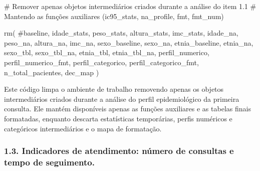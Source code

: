 \documentclass[
]{article}
\newenvironment{Shaded}{\begin{snugshade}}{\end{snugshade}}
\newcommand{\CommentTok}[1]{\textcolor[rgb]{0.37,0.37,0.37}{#1}}
\newcommand{\FunctionTok}[1]{\textcolor[rgb]{0.28,0.35,0.67}{#1}}
\newcommand{\NormalTok}[1]{\textcolor[rgb]{0.00,0.23,0.31}{#1}}
\begin{document}
\begin{Shaded}
\begin{Highlighting}[]
\CommentTok{\# Remover apenas objetos intermediários criados durante a análise do item 1.1}
\CommentTok{\# Mantendo as funções auxiliares (ic95\_stats, na\_profile, fmt, fmt\_num)}

\FunctionTok{rm}\NormalTok{(}
  \CommentTok{\#baseline,}
\NormalTok{  idade\_stats, peso\_stats, altura\_stats, imc\_stats,}
\NormalTok{  idade\_na, peso\_na, altura\_na, imc\_na,}
\NormalTok{  sexo\_baseline, sexo\_na,}
\NormalTok{  etnia\_baseline, etnia\_na,}
\NormalTok{  sexo\_tbl, sexo\_tbl\_na,}
\NormalTok{  etnia\_tbl, etnia\_tbl\_na,}
\NormalTok{  perfil\_numerico, }
\NormalTok{  perfil\_numerico\_fmt,}
\NormalTok{  perfil\_categorico, }
\NormalTok{  perfil\_categorico\_fmt,}
\NormalTok{  n\_total\_pacientes,}
\NormalTok{  dec\_map}
\NormalTok{)}
\end{Highlighting}
\end{Shaded}

Este código limpa o ambiente de trabalho removendo apenas os objetos
intermediários criados durante a análise do perfil epidemiológico da
primeira consulta. Ele mantém disponíveis apenas as funções auxiliares e
as tabelas finais formatadas, enquanto descarta estatísticas
temporárias, perfis numéricos e categóricos intermediários e o mapa de
formatação.

\subsubsection{1.3. Indicadores de atendimento: número de consultas e
tempo de
seguimento.}\label{indicadores-de-atendimento-nuxfamero-de-consultas-e-tempo-de-seguimento.}
\end{document}
